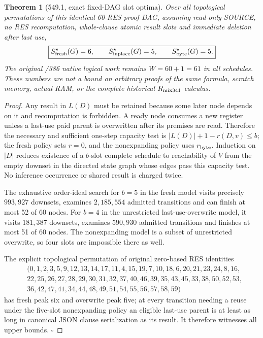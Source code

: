 \documentclass[11pt]{article}
\newtheorem{theorem}{Theorem}
\begin{document}
\begin{theorem}[549.1, exact fixed-DAG slot optima]
Over \emph{all} topological permutations of this identical 60-RES proof DAG, assuming read-only SOURCE, no RES recomputation, whole-clause atomic result slots and immediate deletion after last use,
\[
 \boxed{S_{\rm fresh}^{\star}(G)=6,\qquad
 S_{\rm inplace}^{\star}(G)=5,\qquad
 S_{\rm byte}^{\star}(G)=5.}
\]
The original /386 native logical work remains $W=60+1=61$ in all schedules. These numbers are \emph{not} a bound on arbitrary proofs of the same formula, scratch memory, actual RAM, or the complete historical $R_{\rm mix341}$ calculus.
\end{theorem}
\begin{proof}
Any result in $L(D)$ must be retained because some later node depends on it and recomputation is forbidden. A ready node consumes a new register unless a last-use paid parent is overwritten after its premises are read. Therefore the necessary and sufficient one-step capacity test is $|L(D)|+1-r(D,v)\leq b$; the fresh policy sets $r=0$, and the nonexpanding policy uses $r_{\rm byte}$. Induction on $|D|$ reduces existence of a $b$-slot complete schedule to reachability of $V$ from the empty downset in the directed state graph whose edges pass this capacity test. No inference occurrence or shared result is charged twice.

The exhaustive order-ideal search for $b=5$ in the fresh model visits precisely $993{,}927$ downsets, examines $2{,}185{,}554$ admitted transitions and can finish at most 52 of 60 nodes. For $b=4$ in the unrestricted last-use-overwrite model, it visits $181{,}387$ downsets, examines $590{,}930$ admitted transitions and finishes at most 51 of 60 nodes. The nonexpanding model is a subset of unrestricted overwrite, so four slots are impossible there as well.

The explicit topological permutation of original zero-based RES identities
\begin{align*}
&(0,1,2,3,5,9,12,13,14,17,11,4,15,19,7,10,18,6,20,21,23,24,8,16,\\
&22,25,26,27,28,29,30,31,32,37,40,46,39,35,43,45,33,38,50,52,53,\\
&36,42,47,41,34,44,48,49,51,54,55,56,57,58,59)
\end{align*}
has fresh peak six and overwrite peak five; at every transition needing a reuse under the five-slot nonexpanding policy an eligible last-use parent is at least as long in canonical JSON clause serialization as its result. It therefore witnesses all upper bounds. $\square$
\end{proof}
\end{document}

